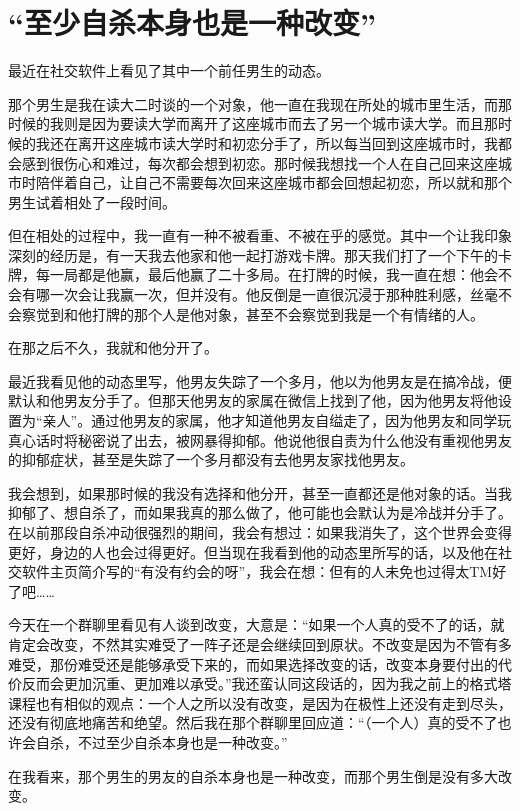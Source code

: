 \chapter{“至少自杀本身也是一种改变”}





最近在社交软件上看见了其中一个前任男生的动态。

那个男生是我在读大二时谈的一个对象，他一直在我现在所处的城市里生活，而那时候的我则是因为要读大学而离开了这座城市而去了另一个城市读大学。而且那时候的我还在离开这座城市读大学时和初恋分手了，所以每当回到这座城市时，我都会感到很伤心和难过，每次都会想到初恋。那时候我想找一个人在自己回来这座城市时陪伴着自己，让自己不需要每次回来这座城市都会回想起初恋，所以就和那个男生试着相处了一段时间。

但在相处的过程中，我一直有一种不被看重、不被在乎的感觉。其中一个让我印象深刻的经历是，有一天我去他家和他一起打游戏卡牌。那天我们打了一个下午的卡牌，每一局都是他赢，最后他赢了二十多局。在打牌的时候，我一直在想：他会不会有哪一次会让我赢一次，但并没有。他反倒是一直很沉浸于那种胜利感，丝毫不会察觉到和他打牌的那个人是他对象，甚至不会察觉到我是一个有情绪的人。

在那之后不久，我就和他分开了。

最近我看见他的动态里写，他男友失踪了一个多月，他以为他男友是在搞冷战，便默认和他男友分手了。但那天他男友的家属在微信上找到了他，因为他男友将他设置为“亲人”。通过他男友的家属，他才知道他男友自缢走了，因为他男友和同学玩真心话时将秘密说了出去，被网暴得抑郁。他说他很自责为什么他没有重视他男友的抑郁症状，甚至是失踪了一个多月都没有去他男友家找他男友。

我会想到，如果那时候的我没有选择和他分开，甚至一直都还是他对象的话。当我抑郁了、想自杀了，而如果我真的那么做了，他可能也会默认为是冷战并分手了。在以前那段自杀冲动很强烈的期间，我会有想过：如果我消失了，这个世界会变得更好，身边的人也会过得更好。但当现在我看到他的动态里所写的话，以及他在社交软件主页简介写的“有没有约会的呀”，我会在想：但有的人未免也过得太TM好了吧……

今天在一个群聊里看见有人谈到改变，大意是：“如果一个人真的受不了的话，就肯定会改变，不然其实难受了一阵子还是会继续回到原状。不改变是因为不管有多难受，那份难受还是能够承受下来的，而如果选择改变的话，改变本身要付出的代价反而会更加沉重、更加难以承受。”我还蛮认同这段话的，因为我之前上的格式塔课程也有相似的观点：一个人之所以没有改变，是因为在极性上还没有走到尽头，还没有彻底地痛苦和绝望。然后我在那个群聊里回应道：“（一个人）真的受不了也许会自杀，不过至少自杀本身也是一种改变。”

在我看来，那个男生的男友的自杀本身也是一种改变，而那个男生倒是没有多大改变。



